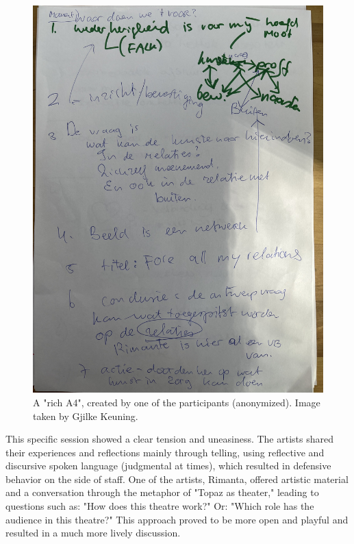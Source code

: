 \documentclass[authordate, empirical]{jote-new-article}
\begin{document}
	\begin{figure}
		\includegraphics[width=\linewidth]{media/fig+1.jpeg}

		\caption{A "rich A4", created by one of the participants (anonymized). Image taken by Gjilke Keuning.}



	\end{figure}













	This specific session showed a clear tension and uneasiness. The artists shared their experiences and reflections mainly through telling, using reflective and discursive spoken language (judgmental at times), which resulted in defensive behavior on the side of staff. One of the artists, Rimanta, offered artistic material and a conversation through the metaphor of "Topaz as theater," leading to questions such as: "How does this theatre work?" Or: "Which role has the audience in this theatre?" This approach proved to be more open and playful and resulted in a much more lively discussion.
\end{document}

